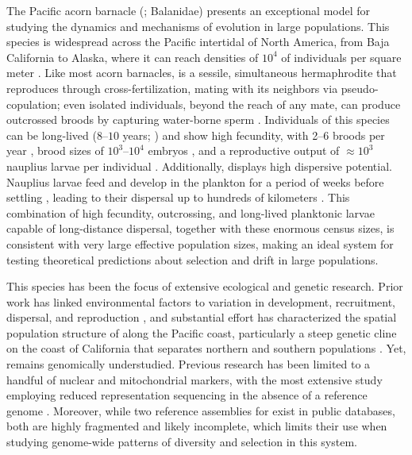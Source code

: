 The Pacific acorn barnacle (\balgla{}; Balanidae) presents an exceptional model for
studying the dynamics and mechanisms of evolution in large populations.
This species is widespread across the Pacific intertidal of North America, from Baja
California to Alaska, where it can reach densities of $10^4$ of individuals per square
meter \citep{menge_recruitment_2000}.
Like most acorn barnacles, \bgla{} is a sessile, simultaneous hermaphrodite that
reproduces through cross-fertilization, mating with its neighbors via pseudo-copulation;
even isolated individuals, beyond the reach of any mate, can produce outcrossed broods
by capturing water-borne sperm \citep{barazandeh_spermcast_2014}.
Individuals of this species can be long-lived ($8 \mbox{--} 10$ years;
\citealp{newman_cirripedia_1980}) and show high fecundity, with 2--6 broods per year
\citep{hoeg_cirripedia_1987,hines_reproduction_1978}, brood sizes of $10^3 \mbox{--} 10^4$
embryos \citep{barnes_general_1956}, and a reproductive output of $\approx10^3$ nauplius
larvae per individual \citep{leslie_barnacle_2005}.
Additionally, \bgla{} displays high dispersive potential.
Nauplius larvae feed and develop in the plankton for a period of weeks before settling
\citep{brown_larvae_1985,pfeiffer-hoyt_modeling_2005}, leading to their dispersal up
to hundreds of kilometers \citep{sotka_larvae_2006,sotka_strong_2004}.
This combination of high fecundity, outcrossing, and long-lived planktonic larvae
capable of long-distance dispersal, together with these enormous census sizes, is
consistent with very large effective population sizes, making \bgla{} an ideal system
for testing theoretical predictions about selection and drift in large populations.
\vspace{0.1cm}

This species has been the focus of extensive ecological and genetic research. Prior work
has linked environmental factors to variation in development, recruitment, dispersal,
and reproduction \citep{berger_spatial_2006,berger_reproduction_2009,
barshis_coastal_2011,pfeiffer-hoyt_modeling_2005,schubart_recruitment_1995}, and
substantial effort has characterized the spatial population structure of \bgla{}
along the Pacific coast, particularly a steep genetic cline on the coast of
California that separates northern and southern populations
\citep{sotka_strong_2004,wares_diversification_2005,wares_maintenance_2019,
wares_diversity_2021}.
Yet, \bgla{} remains genomically understudied.
Previous research has been limited to a handful of nuclear and mitochondrial markers,
with the most extensive study employing reduced representation sequencing in the
absence of a reference genome \citep{wares_diversity_2021}.
Moreover, while two reference assemblies for \bgla{} exist in public databases, both are
highly fragmented and likely incomplete, which limits their use when studying genome-wide
patterns of diversity and selection in this system.
\vspace{0.1cm}

